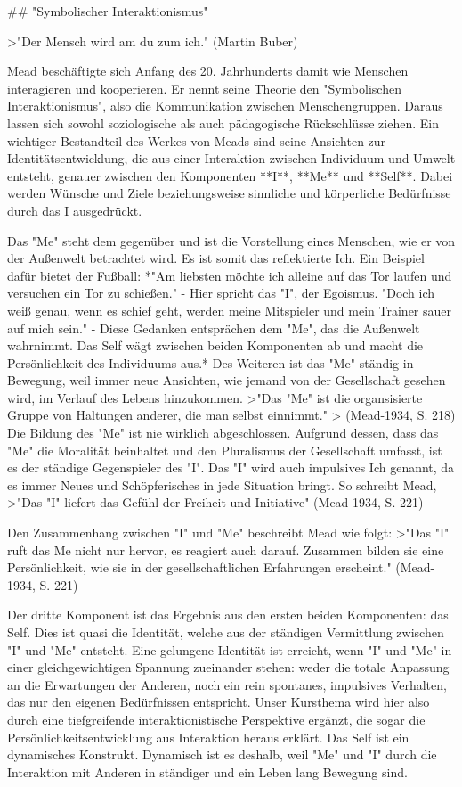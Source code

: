 ## "Symbolischer Interaktionismus"

>"Der Mensch wird am du zum ich." (Martin Buber)

Mead beschäftigte sich Anfang des 20. Jahrhunderts damit wie Menschen interagieren und kooperieren.
Er nennt seine Theorie den "Symbolischen Interaktionismus", also die Kommunikation zwischen Menschengruppen.
Daraus lassen sich sowohl soziologische als auch pädagogische Rückschlüsse ziehen.
Ein wichtiger Bestandteil des Werkes von Meads sind seine Ansichten zur Identitätsentwicklung, die aus einer Interaktion zwischen Individuum und Umwelt entsteht, genauer zwischen den Komponenten **I**, **Me** und **Self**.
Dabei werden Wünsche und Ziele beziehungsweise sinnliche und körperliche Bedürfnisse durch das I ausgedrückt.

Das "Me" steht dem gegenüber und ist die Vorstellung eines Menschen, wie er von der Außenwelt betrachtet wird.
Es ist somit das reflektierte Ich.
Ein Beispiel dafür bietet der Fußball:
*"Am liebsten möchte ich alleine auf das Tor laufen und versuchen ein Tor zu schießen."
- Hier spricht das "I", der Egoismus.
"Doch ich weiß genau, wenn es schief geht, werden meine Mitspieler und mein Trainer sauer auf mich sein."
- Diese Gedanken entsprächen dem "Me", das die Außenwelt wahrnimmt.
Das Self wägt zwischen beiden Komponenten ab und macht die Persönlichkeit des Individuums aus.*
Des Weiteren ist das "Me" ständig in Bewegung, weil immer neue Ansichten, wie jemand von der Gesellschaft gesehen wird, im Verlauf des Lebens hinzukommen.
>"Das "Me" ist die organsisierte Gruppe von Haltungen anderer, die man selbst einnimmt."
> (Mead-1934, S. 218)
Die Bildung des "Me" ist nie wirklich abgeschlossen.
Aufgrund dessen, dass das "Me" die Moralität beinhaltet und den Pluralismus der Gesellschaft umfasst, ist es der ständige Gegenspieler des "I".
Das "I" wird auch impulsives Ich genannt, da es immer Neues und Schöpferisches in jede Situation bringt.
So schreibt Mead,
>"Das "I" liefert das Gefühl der Freiheit und Initiative" (Mead-1934, S. 221)

Den Zusammenhang zwischen "I" und "Me" beschreibt Mead wie folgt:
>"Das "I" ruft das Me nicht nur hervor, es reagiert auch darauf. Zusammen bilden sie eine Persönlichkeit, wie sie in der gesellschaftlichen Erfahrungen erscheint." (Mead-1934, S. 221)

Der dritte Komponent ist das Ergebnis aus den ersten beiden Komponenten: das Self.
Dies ist quasi die Identität, welche aus der ständigen Vermittlung zwischen "I" und "Me" entsteht.
Eine gelungene Identität ist erreicht, wenn "I" und "Me" in einer gleichgewichtigen Spannung zueinander stehen: weder die totale Anpassung an die Erwartungen der Anderen, noch ein rein spontanes, impulsives Verhalten, das nur den eigenen Bedürfnissen entspricht.
Unser Kursthema wird hier also durch eine tiefgreifende interaktionistische Perspektive ergänzt, die sogar die Persönlichkeitsentwicklung aus Interaktion heraus erklärt.
Das Self ist ein dynamisches Konstrukt.
Dynamisch ist es deshalb, weil "Me" und "I" durch die Interaktion mit Anderen in ständiger und ein Leben lang Bewegung sind.

